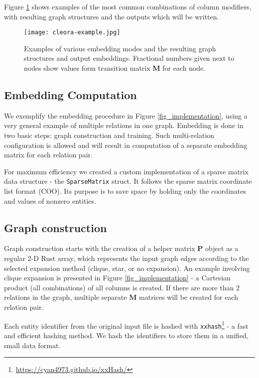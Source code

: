 \documentclass{IEEEtran}
\begin{document}
Figure \ref{fig_cleora-example} shows examples of the most common combinations of column modifiers, with resulting graph structures and the outputs which will be written.

\begin{figure}\centering
\texttt{[image: cleora-example.jpg]}
\caption{Examples of various embedding modes and the resulting graph structures and output embeddings. Fractional numbers given next to nodes show values form transition matrix \textbf{M} for each node.}
\label{fig_cleora-example}
\end{figure}



\subsection{Embedding Computation}
We exemplify the embedding procedure in Figure \ref{fig_implementation}, using a very general example of multiple relations in one graph. Embedding is done in two basic steps: graph construction and training. Such multi-relation configuration is allowed and will result in computation of a separate embedding matrix for each relation pair.

For maximum efficiency we created a custom implementation of a sparse matrix data structure - the \texttt{SparseMatrix} struct. It follows the sparse matrix coordinate list format (COO). Its purpose is to save space by holding only the coordinates and values of nonzero entities.



\subsection{Graph construction} 
Graph construction starts with the creation of a helper matrix $\textbf{P}$ object as a regular 2-D Rust array, which represents the input graph edges  according to the selected expansion method (clique, star, or no expansion). An example involving clique expansion is presented in Figure \ref{fig_implementation} - a Cartesian product (all combinations) of all columns is created. If there are more than 2 relations in the graph, multiple separate $\textbf{M}$ matrices will be created for each relation pair. 

Each entity identifier from the original input file is hashed with \texttt{xxhash}\footnote{\url{https://cyan4973.github.io/xxHash/}} - a fast and efficient hashing method. We hash the identifiers to store them in a unified, small data format.
\end{document}
